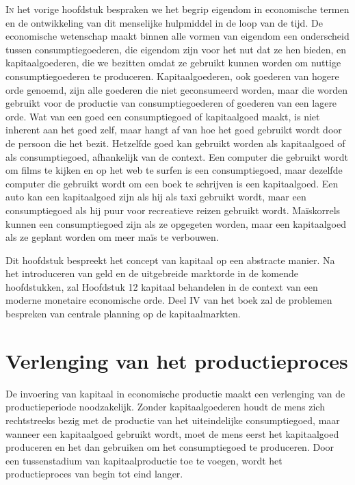 \lettrine{I}n het vorige hoofdstuk bespraken we het begrip eigendom in economische termen en de ontwikkeling van dit menselijke hulpmiddel in de loop van de tijd. De economische wetenschap maakt binnen alle vormen van eigendom een onderscheid tussen consumptiegoederen, die eigendom zijn voor het nut dat ze hen bieden, en kapitaalgoederen, die we bezitten omdat ze gebruikt kunnen worden om nuttige consumptiegoederen te produceren. Kapitaalgoederen, ook goederen van hogere orde genoemd, zijn alle goederen die niet geconsumeerd worden, maar die worden gebruikt voor de productie van consumptiegoederen of goederen van een lagere orde. Wat van een goed een consumptiegoed of kapitaalgoed maakt, is niet inherent aan het goed zelf, maar hangt af van hoe het goed gebruikt wordt door de persoon die het bezit. Hetzelfde goed kan gebruikt worden als kapitaalgoed of als consumptiegoed, afhankelijk van de context. Een computer die gebruikt wordt om films te kijken en op het web te surfen is een consumptiegoed, maar dezelfde computer die gebruikt wordt om een boek te schrijven is een kapitaalgoed. Een auto kan een kapitaalgoed zijn als hij als taxi gebruikt wordt, maar een consumptiegoed als hij puur voor recreatieve reizen gebruikt wordt. Maïskorrels kunnen een consumptiegoed zijn als ze opgegeten worden, maar een kapitaalgoed als ze geplant worden om meer maïs te verbouwen.

Dit hoofdstuk bespreekt het concept van kapitaal op een abstracte manier. Na het introduceren van geld en de uitgebreide marktorde in de komende hoofdstukken, zal Hoofdstuk 12 kapitaal behandelen in de context van een moderne monetaire economische orde. Deel IV van het boek zal de problemen bespreken van centrale planning op de kapitaalmarkten.

\hypertarget{verlenging-van-het-productieproces}{%
\section{Verlenging van het productieproces}\label{verlenging-van-het-productieproces}}

De invoering van kapitaal in economische productie maakt een verlenging van de productieperiode noodzakelijk. Zonder kapitaalgoederen houdt de mens zich rechtstreeks bezig met de productie van het uiteindelijke consumptiegoed, maar wanneer een kapitaalgoed gebruikt wordt, moet de mens eerst het kapitaalgoed produceren en het dan gebruiken om het consumptiegoed te produceren. Door een tussenstadium van kapitaalproductie toe te voegen, wordt het productieproces van begin tot eind langer.


